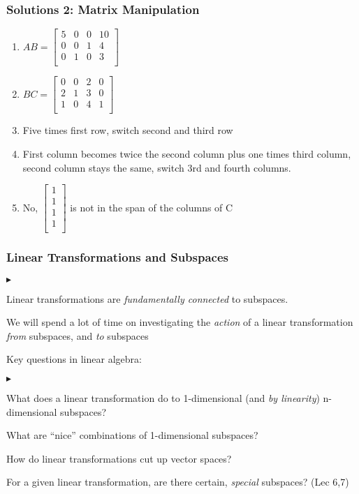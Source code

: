 \documentclass[table]{beamer}
\renewenvironment{itemize}
\renewenvironment{enumerate}%
{\begin{list}{\arabic{enumi}.}%
      {\setlength{\leftmargin}{2.5em}%
       \setlength{\itemsep}{-\parsep}%
       \setlength{\topsep}{-\parskip}%
       \usecounter{enumi}}%
 }{\end{list}}
\renewenvironment{itemize}%
{\begin{list}{$\blacktriangleright$}%
      {\setlength{\leftmargin}{2.5em}%
       \setlength{\itemsep}{-\parsep}%
       \setlength{\topsep}{-\parskip}%
       \usecounter{enumi}}%
 }{\end{list}}
\begin{document}
\begin{frame}
\frametitle{Solutions 2: Matrix Manipulation}
\begin{solution}
\begin{enumerate}
  \item $AB = \begin{bmatrix}
			5 & 0 & 0 & 10  \\
			0 & 0 & 1 & 4   \\
			0 & 1 & 0 & 3   \\
			\end{bmatrix}$
  \item $BC = \begin{bmatrix}
			0 & 0 & 2 & 0  \\
			2 & 1 & 3 & 0   \\
			1 & 0 & 4 & 1  \\
			\end{bmatrix}$
  \item Five times first row, switch second and third row
  \item First column becomes twice the second column plus one times third column, second column stays the same, switch 3rd and fourth columns.
  \item No, $\begin{bmatrix}
  1 \\
  1 \\
  1 \\
  1 \\
  \end{bmatrix}$ is not in the span of the columns of C
  \end{enumerate}
\end{solution}
\end{frame}

\begin{frame}
\frametitle{Linear Transformations and Subspaces}
\begin{itemize}
\item Linear transformations are \textit{fundamentally connected} to subspaces.
\item We will spend a lot of time on investigating the \textit{action} of a linear transformation 
\textit{from} subspaces, and \textit{to} subspaces\\
\medskip
\item Key questions in linear algebra: 
\begin{itemize}
\item What does a linear transformation do to 1-dimensional (and \textit{by linearity}) n-dimensional subspaces?
\item What are ``nice'' combinations of 1-dimensional subspaces?
\item How do linear transformations cut up vector spaces?
\item For a given linear transformation, are there certain, \textit{special} subspaces? (Lec 6,7) 
\end{itemize}
\end{itemize}
\end{frame}
\end{document}
